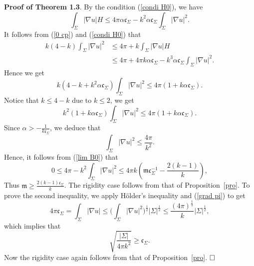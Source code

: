 \documentclass[12pt]{article}
\theoremstyle{definition}
\theoremstyle{plain}
\numberwithin{equation}{section}
\begin{document}
\textbf{Proof of Theorem 1.3}. By the condition (\ref{condi H0}), we have 
\begin{equation}\label{int H }
\int_{\Sigma}|\nabla u|H\leq 4\pi \alpha \mathfrak{c}_{\Sigma}-k^{2}\alpha \mathfrak{c}_{\Sigma}\int_{\Sigma}|\nabla u|^{2}.
\end{equation}
It follows from (\ref{0 cp}) and (\ref{condi H0}) that 
$$
\begin{aligned}
k(4-k)\int_{\Sigma}|\nabla u|^{2}&\leq 4\pi+k\int_{\Sigma}|\nabla u|H\\
&\leq 4\pi+4\pi k\alpha \mathfrak{c}_{\Sigma}-k^{3}\alpha \mathfrak{c}_{\Sigma}\int_{\Sigma}|\nabla u|^{2}.
\end{aligned}
$$
Hence we get 
$$
k(4-k+k^{2}\alpha \mathfrak{c}_{\Sigma})\int_{\Sigma}|\nabla u|^{2}\leq 4\pi (1+k\alpha \mathfrak{c}_{\Sigma}).
$$
Notice that $ k\leq 4-k $ due to $ k\leq 2 $, we get  
$$
k^{2}(1+k\alpha \mathfrak{c}_{\Sigma})\int_{\Sigma}|\nabla u|^{2}\leq 4\pi (1+k\alpha \mathfrak{c}_{\Sigma}).
$$
Since $ \alpha>-\frac{1}{k\mathfrak{c}_{\Sigma}} $, we deduce that 
\begin{equation}\label{grad pi}
\int_{\Sigma}|\nabla u|^{2}\leq \frac{4\pi}{k^{2}}.
\end{equation}
Hence, it follows from (\ref{lim B0}) that
$$
0\leq 4\pi-k^{2}\int_{\Sigma}|\nabla u|^{2}\leq 4\pi k (\mathfrak{m}\mathfrak{c}_{\Sigma}^{-1}-\frac{2(k-1)}{k}),
$$ 
Thus $ \mathfrak{m}\geq \frac{2(k-1)\mathfrak{c}_{\Sigma}}{k} $. The rigidity case follows from that of Proposition~\ref{pro}. To prove the second inequality,  we apply H\"older's inequality and (\ref{grad pi}) to get
$$
4\pi \mathfrak{c}_{\Sigma}=\int_{\Sigma}|\nabla u|\leq \Big(\int_{\Sigma}|\nabla u|^{2}\Big)^{\frac{1}{2}}|\Sigma|^{\frac{1}{2}}\leq \frac{(4\pi)^{\frac{1}{2}}}{k}|\Sigma|^{\frac{1}{2}},
$$
which implies that 
$$
\sqrt{\frac{|\Sigma|}{4\pi k^{2}}}\geq \mathfrak{c}_{\Sigma}.
$$ 
Now the rigidity case again follows from that of Proposition~\ref{pro}.
$\hfill\square$
\end{document}
